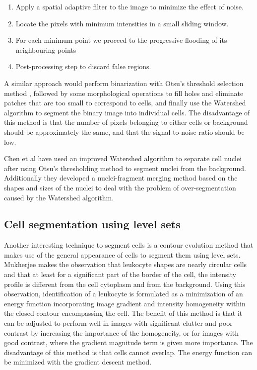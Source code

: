 \documentclass[12pt,a4paper,openany]{book}
\begin{document}
\begin{enumerate}
  \item Apply a spatial adaptive filter to the image to minimize the effect of noise.
  \item Locate the pixels with minimum intensities in a small sliding window.
  \item For each minimum point we proceed to the progressive flooding of its neighbouring points
  \item Post-processing step to discard false regions.
\end{enumerate}

A similar approach would perform binarization with Otsu's threshold selection method \cite{otsu79}, followed by some morphological operations \cite{serra83} to fill holes and eliminate patches that are too small to correspond to cells, and finally use the Watershed algorithm \cite{beucher79} to segment the binary image into individual cells. The disadvantage of this method is that the number of pixels belonging to either cells or background should be approximately the same, and that the signal-to-noise ratio should be low.

Chen et al \cite{chen06} have used an improved Watershed algorithm \cite{vincent93} to separate cell nuclei after using Otsu's thresholding method to segment nuclei from the background. Additionally they developed a nuclei-fragment merging method based on the shapes and sizes of the nuclei to deal with the problem of over-segmentation caused by the Watershed algorithm.


\subsection{Cell segmentation using level sets}

Another interesting technique to segment cells is a contour evolution method that makes use of the general appearance of cells to segment them using level sets. Mukherjee \cite{mukherjee04} makes the observation that leukocyte shapes are nearly circular cells and that at least for a significant part of the border of the cell, the intensity profile is different from the cell cytoplasm and from the background. Using this observation, identification of a leukocyte is formulated as a minimization of an energy function incorporating image gradient and intensity homogeneity within the closed contour encompassing the cell. The benefit of this method is that it can be adjusted to perform well in images with significant clutter and poor contrast by increasing the importance of the homogeneity, or for images with good contrast, where the gradient magnitude term is given more importance. The disadvantage of this method is that cells cannot overlap. The energy function can be minimized with the gradient descent method.
\end{document}
